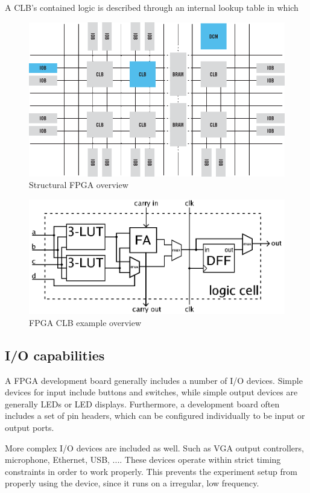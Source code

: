 \documentclass[openright]{template/uva-bachelor-thesis}
\begin{document}
A CLB's contained logic is described through an internal lookup table in which 

\begin{figure}
\centering
\includegraphics[width=.7\textwidth]{img/fpga-block-structure}
\caption{Structural FPGA overview \cite{xilinxFPGA}}
\label{fig:fpgastructure}
\end{figure}

\begin{figure}
\centering
\includegraphics[width=.7\textwidth]{img/fpga-clb}
\caption{FPGA CLB example overview \cite{fpgaclbimg}}
\label{fig:my_label}
\end{figure}



\subsection{I/O capabilities}
A FPGA development board generally includes a number of I/O devices. Simple devices for input include buttons and switches, while simple output devices are generally LEDs or LED displays. Furthermore, a development board often includes a set of pin headers, which can be configured individually to be input or output ports. 

More complex I/O devices are included as well. Such as VGA output controllers, microphone, Ethernet, USB, .... These devices operate within strict timing constraints in order to work properly. This prevents the experiment setup from properly using the device, since it runs on a irregular, low frequency. 
\end{document}
